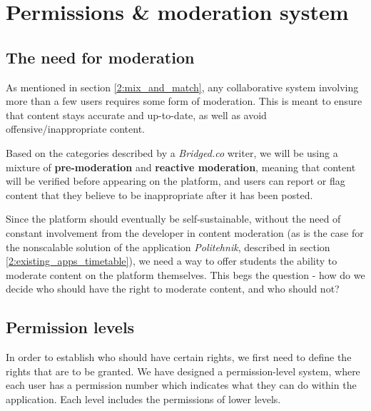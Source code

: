 \section{Permissions \& moderation system} \label{4:permissions}

\subsection{The need for moderation} \label{4:permissions_need}

As mentioned in section \ref{2:mix_and_match}, any collaborative system involving more than a few users requires some form of moderation\cite{roberts2019behind}. This is meant to ensure that content stays accurate and up-to-date, as well as avoid offensive/inappropriate content.

Based on the categories described by a \textit{Bridged.co} writer\cite{bridged2019moderation}, we will be using a mixture of \textbf{pre-moderation} and \textbf{reactive moderation}, meaning that content will be verified before appearing on the platform, and users can report or flag content that they believe to be inappropriate after it has been posted.

Since the platform should eventually be self-sustainable, without the need of constant involvement from the developer in content moderation (as is the case for the nonscalable solution of the application \textit{Politehnik}, described in section \ref{2:existing_apps_timetable}), we need a way to offer students the ability to moderate content on the platform themselves. This begs the question - how do we decide who should have the right to moderate content, and who should not?

\subsection{Permission levels} \label{4:permissions_levels}

In order to establish who should have certain rights, we first need to define the rights that are to be granted. We have designed a permission-level system, where each user has a permission number which indicates what they can do within the application. Each level includes the permissions of lower levels.

